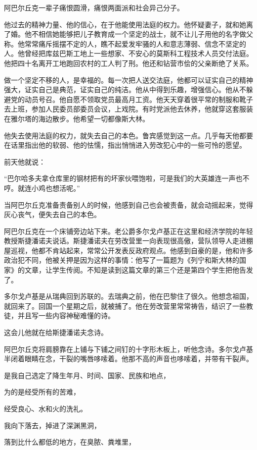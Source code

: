 阿巴尔丘克一辈子痛恨圆滑，痛恨两面派和社会异己分子。

他过去的精神力量、他的信心，在于他能使用法庭的权力。他怀疑妻子，就和她离了婚。他不相信她能够把儿子教育成一个坚定的战士，就不让儿子用他的名字做父称。他常常痛斥摇摆不定的人，瞧不起爱发牢骚的人和意志薄弱、信念不坚定的人。他曾经把库兹巴斯工地上一些想家、不安心的莫斯科工程技术人员交付法庭。他把四十名离开工地跑回农村的工人判了刑。他还和钻营市侩的父亲断绝了关系。

做一个坚定不移的人，是幸福的。每一次把人送交法庭，他都可以证实自己的精神强大，证实自己是典范，证实自己的纯洁。他从中得到乐趣，增强信心。他从不躲避党的动员号召。他自愿不领取党员最高月工资。他天天穿着很平常的制服和靴子去上班，参加人民委员部委员会议，上戏院。有时党派他去休养，他就穿这套服装在雅尔塔的海边散步。他希望一切都像斯大林。

他失去使用法庭的权力，就失去自己的本色。鲁宾感觉到这一点。几乎每天他都要在话里指出他的软弱、他的怯懦，指出悄悄进入劳改犯心中的一些可怜的愿望。

前天他就说：

“巴尔哈多夫拿仓库里的钢材把有的坏家伙喂饱啦，可是我们的大英雄连一声也不哼。就连小鸡也想活呢。”

当阿巴尔丘克准备责备别人的时候，他感到自己也会被责备，就会动摇起来，觉得灰心丧气，便失去自己的本色。

阿巴尔丘克在一个床铺旁边站下来。老公爵多尔戈卢基正在这里和经济学院的年轻教授斯捷潘诺夫说话。斯捷潘诺夫在劳改营里一向表现很高傲，营队领导人走进棚屋巡视，他都不肯站起来，常常公开发表反政府观点。他感到自豪的是，他和许多政治犯不同，他被关押是因为这样的事情：他写了一篇题为《列宁和斯大林的国家》的文章，让学生传阅。不知是读到这篇文章的第三个还是第四个学生把他告发了。

多尔戈卢基是从瑞典回到苏联的。去瑞典之前，他在巴黎住了很久。他想念祖国，就回来了。回国一个星期之后，就被捕了。他在劳改营里常常祷告，结识了一些教徒，并且写一些内容神秘难懂的诗。

这会儿他就在给斯捷潘诺夫念诗。

阿巴尔丘克将肩膀靠在上铺与下铺之间钉的十字形木板上，听他念诗。多尔戈卢基半闭着眼睛在念，干裂的嘴唇哆嗦着。他那不高的声音也哆嗦着，并带有干裂声。

是我自己选定了降生年月、时间、国家、民族和地点，

为的是经受所有的苦难，

经受良心、水和火的洗礼。

我向下落去，掉进了深渊黑洞，

落到比什么都低的地方，在臭脓、粪堆里，

